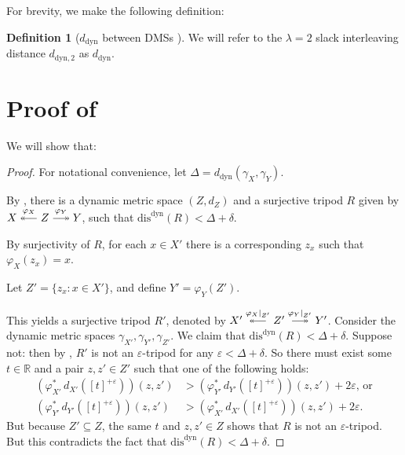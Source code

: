 \documentclass[a4paper,UKenglish,thm-restate]{article}
\theoremstyle{definition}
\newtheorem{definition}[theorem]{Definition}
\DeclareRobustCommand\longtwoheadrightarrow
     {\relbar\joinrel\twoheadrightarrow}
\DeclareRobustCommand\longtwoheadleftarrow
     {\twoheadleftarrow\joinrel\relbar}
\begin{document}
\begin{appendices}
        For brevity, we make the following definition:
        
        \begin{definition}[$d_{\mathrm{dyn}}$ between DMSs \cite{stablesignatures}]\label{def:ddynmetric}
            We will refer to the $\lambda=2$ slack interleaving distance $d_{\mathrm{dyn}, 2}$ as $d_{\mathrm{dyn}}$.
        \end{definition}
    
    \section{Proof of } \label{app:dynghsubsetproof}
        We will show that:
        \dynghsubsetrestate*
        \begin{proof}
            For notational convenience, let $\Delta = d_{\text{dyn}}(\gamma_X, \gamma_Y)$.
            
            By , there is a dynamic metric space $(Z, d_Z)$ and a surjective tripod $R$ given by $X \overset{\varphi_X}{\longtwoheadleftarrow} Z \overset{\varphi_Y}{\longtwoheadrightarrow} Y$, such that $\text{dis}^{\text{dyn}}(R) < \Delta + \delta$.
            
            By surjectivity of $R$, for each $x \in X'$ there is a corresponding $z_x$ such that $\varphi_X(z_x) = x$. 
            
            Let $Z' = \{z_x : x \in X' \}$, and define $Y' = \varphi_Y(Z')$.
            
            This yields a surjective tripod $R'$, denoted by $X' \overset{\varphi_X |_{Z'}}{\longtwoheadleftarrow} Z' \overset{\varphi_Y |_{Z'}}{\longtwoheadrightarrow} Y'$. Consider the dynamic metric spaces $\gamma_{X'}, \gamma_{Y'}, \gamma_{Z'}$. We claim that $\text{dis}^{\text{dyn}}(R) < \Delta + \delta$. Suppose not: then by , $R'$ is not an $\varepsilon$-tripod for any $\varepsilon < \Delta + \delta$. So there must exist some $t \in \mathbb{R}$ and a pair $z, z' \in Z'$ such that one of the following holds:
            \begin{align*}
                \left(\varphi_{X'}^{*} \, d_{X'}([t]^{+\varepsilon})\right)(z, z') &> \left(\varphi_{Y'}^{*} \, d_{Y'}([t]^{+\varepsilon})\right)(z, z') + 2 \varepsilon \text{, or}\\
                \left(\varphi_{Y'}^{*} \, d_{Y'}([t]^{+\varepsilon})\right)(z, z') &> \left(\varphi_{X'}^{*} \, d_{X'}([t]^{+\varepsilon})\right)(z, z') + 2 \varepsilon.
            \end{align*}
            But because $Z' \subseteq Z$, the same $t$ and $z, z' \in Z$ shows that $R$ is not an $\varepsilon$-tripod. But this contradicts the fact that $\text{dis}^{\text{dyn}}(R) < \Delta + \delta$.
    

\end{proof}
\end{appendices}
\end{document}
